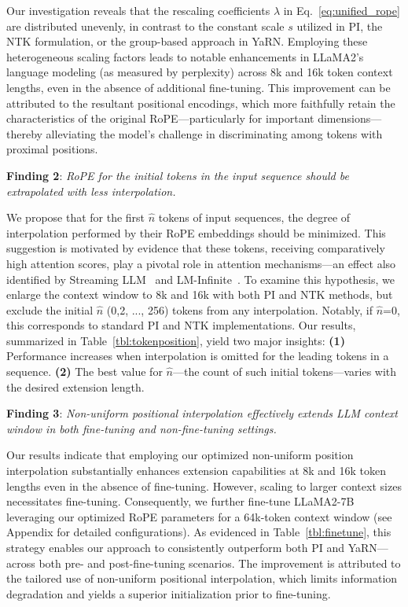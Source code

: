 Our investigation reveals that the rescaling coefficients $\lambda$ in Eq.~\ref{eq:unified_rope} are distributed unevenly, in contrast to the constant scale $s$ utilized in PI, the NTK formulation, or the group-based approach in YaRN. Employing these heterogeneous scaling factors leads to notable enhancements in LLaMA2’s language modeling (as measured by perplexity) across 8k and 16k token context lengths, even in the absence of additional fine-tuning. This improvement can be attributed to the resultant positional encodings, which more faithfully retain the characteristics of the original RoPE—particularly for important dimensions—thereby alleviating the model’s challenge in discriminating among tokens with proximal positions.

\textbf{Finding 2}: \textit{RoPE for the initial tokens in the input sequence should be extrapolated with less interpolation.} 

We propose that for the first $\hat{n}$ tokens of input sequences, the degree of interpolation performed by their RoPE embeddings should be minimized. This suggestion is motivated by evidence that these tokens, receiving comparatively high attention scores, play a pivotal role in attention mechanisms—an effect also identified by Streaming LLM~\cite{streamingllm} and LM-Infinite~\cite{han2023lminfinite}. To examine this hypothesis, we enlarge the context window to 8k and 16k with both PI and NTK methods, but exclude the initial $\hat n$ (0,2, ..., 256) tokens from any interpolation. Notably, if $\hat n$=0, this corresponds to standard PI and NTK implementations. Our results, summarized in Table~\ref{tbl:tokenposition}, yield two major insights: \textbf{(1)} Performance increases when interpolation is omitted for the leading tokens in a sequence. \textbf{(2)} The best value for $\hat n$—the count of such initial tokens—varies with the desired extension length.

\textbf{Finding 3}: \textit{Non-uniform positional interpolation effectively extends LLM context window in both fine-tuning and non-fine-tuning settings.} 

Our results indicate that employing our optimized non-uniform position interpolation substantially enhances extension capabilities at 8k and 16k token lengths even in the absence of fine-tuning. However, scaling to larger context sizes necessitates fine-tuning. Consequently, we further fine-tune LLaMA2-7B leveraging our optimized RoPE parameters for a 64k-token context window (see Appendix for detailed configurations). As evidenced in Table~\ref{tbl:finetune}, this strategy enables our approach to consistently outperform both PI and YaRN—across both pre- and post-fine-tuning scenarios. The improvement is attributed to the tailored use of non-uniform positional interpolation, which limits information degradation and yields a superior initialization prior to fine-tuning.

